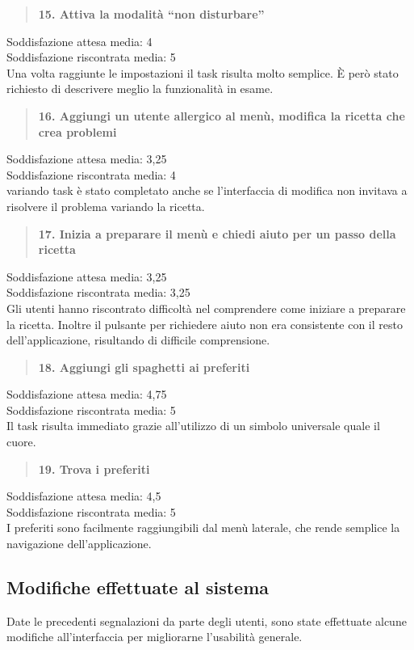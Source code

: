 \begin{quote}
	\textbf{15. Attiva la modalità ``non disturbare''}
\end{quote}
Soddisfazione attesa media: 4\\
Soddisfazione riscontrata media: 5\\
Una volta raggiunte le impostazioni il task risulta molto semplice.  È però
stato richiesto di descrivere meglio la funzionalità in esame.

\begin{quote}
	\textbf{16. Aggiungi un utente allergico al menù, modifica la ricetta che
	crea problemi}
\end{quote}
Soddisfazione attesa media: 3,25\\
Soddisfazione riscontrata media: 4\\
variando task è stato completato anche se l'interfaccia di modifica non invitava a
risolvere il problema variando la ricetta.

\begin{quote}
	\textbf{17. Inizia a preparare il menù e chiedi aiuto per un passo della
	ricetta}
\end{quote}
Soddisfazione attesa media: 3,25\\
Soddisfazione riscontrata media: 3,25\\
Gli utenti hanno riscontrato difficoltà nel comprendere come iniziare a
preparare la ricetta.  Inoltre il pulsante per richiedere aiuto non era
consistente con il resto dell'applicazione, risultando di difficile
comprensione.

\begin{quote}
	\textbf{18. Aggiungi gli spaghetti ai preferiti}
\end{quote}
Soddisfazione attesa media: 4,75\\
Soddisfazione riscontrata media: 5\\
Il task risulta immediato grazie all'utilizzo di un simbolo universale quale il
cuore.

\begin{quote}
	\textbf{19. Trova i preferiti}
\end{quote}
Soddisfazione attesa media: 4,5\\
Soddisfazione riscontrata media: 5\\
I preferiti sono facilmente raggiungibili dal menù laterale, che rende semplice
la navigazione dell'applicazione.

\subsection{Modifiche effettuate al sistema}
Date le precedenti segnalazioni da parte degli utenti, sono state effettuate
alcune modifiche all'interfaccia per migliorarne l'usabilità generale.

